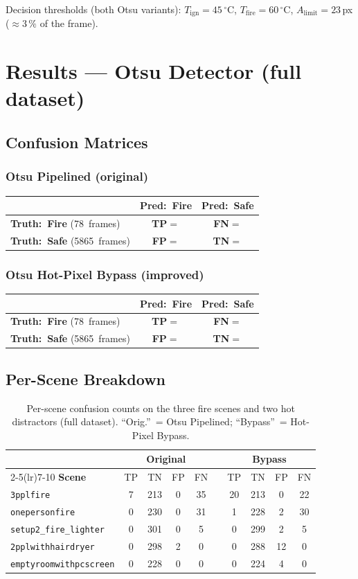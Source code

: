 \documentclass[11pt, a4paper]{article}
\newcommand{\confmat}[6]{%
    \def\cmTP{#1}\def\cmFN{#2}\def\cmFP{#3}\def\cmTN{#4}%
    \def\cmPos{#5}\def\cmNeg{#6}%
    \vspace{4pt}
    \begin{center}
    \renewcommand{\arraystretch}{1.8}%
    \begin{tabular}{lcc}
        \hline
        \rule{0pt}{2.4ex}%
        & \textbf{Pred:\ Fire} & \textbf{Pred:\ Safe} \\[2pt]
        \hline
        \rule{0pt}{2.6ex}%
        \textbf{Truth:\ Fire} (\cmPos\ frames)
            & \cellcolor{cellgreenlight}\textcolor{tpgreen}{\textbf{TP}}\;$=$\;\cmTP
            & \cellcolor{cellyellowlight}\textcolor{fnyellow}{\textbf{FN}}\;$=$\;\cmFN \\[4pt]
        \textbf{Truth:\ Safe} (\cmNeg\ frames)
            & \cellcolor{cellredlight}\textcolor{fpred}{\textbf{FP}}\;$=$\;\cmFP
            & \cellcolor{cellbluelight}\textcolor{tnblue}{\textbf{TN}}\;$=$\;\cmTN \\[2pt]
        \hline
    \end{tabular}
    \end{center}
    \vspace{4pt}
}
\begin{document}
Decision thresholds (both Otsu variants): $T_{\text{ign}}=45\,^\circ$C,
$T_{\text{fire}}=60\,^\circ$C, $A_{\text{limit}}=23$\,px ($\approx3\,\%$ of the frame).

\section{Results — Otsu Detector (full dataset)}

\subsection{Confusion Matrices}

\subsubsection*{Otsu Pipelined (original)}
\confmat{7}{71}{3}{5862}{78}{5865}

\subsubsection*{Otsu Hot-Pixel Bypass (improved)}
\confmat{21}{57}{31}{5834}{78}{5865}

\subsection{Per-Scene Breakdown}

\begin{table}[H]
\centering
\caption{Per-scene confusion counts on the three fire scenes and two hot distractors
(full dataset).  ``Orig.''\ = Otsu Pipelined; ``Bypass''\ = Hot-Pixel Bypass.}
\renewcommand{\arraystretch}{1.3}
\begin{tabular}{l cccc c cccc}
\toprule
& \multicolumn{4}{c}{\textbf{Original}} & & \multicolumn{4}{c}{\textbf{Bypass}} \\
\cmidrule(lr){2-5}\cmidrule(lr){7-10}
\textbf{Scene} & TP & TN & FP & FN & & TP & TN & FP & FN \\
\midrule
\texttt{3pplfire}              & 7 & 213 & 0 & 35 & & 20 & 213 & 0  & 22 \\
\texttt{onepersonfire}         & 0 & 230 & 0 & 31 & &  1 & 228 & 2  & 30 \\
\texttt{setup2\_fire\_lighter} & 0 & 301 & 0 &  5 & &  0 & 299 & 2  &  5 \\
\addlinespace
\texttt{2pplwithhairdryer}     & 0 & 298 & 2 &  0 & &  0 & 288 & 12 &  0 \\
\texttt{emptyroomwithpcscreen} & 0 & 228 & 0 &  0 & &  0 & 224 & 4  &  0 \\
\bottomrule
\end{tabular}
\label{tab:perscene}
\end{table}
\end{document}
